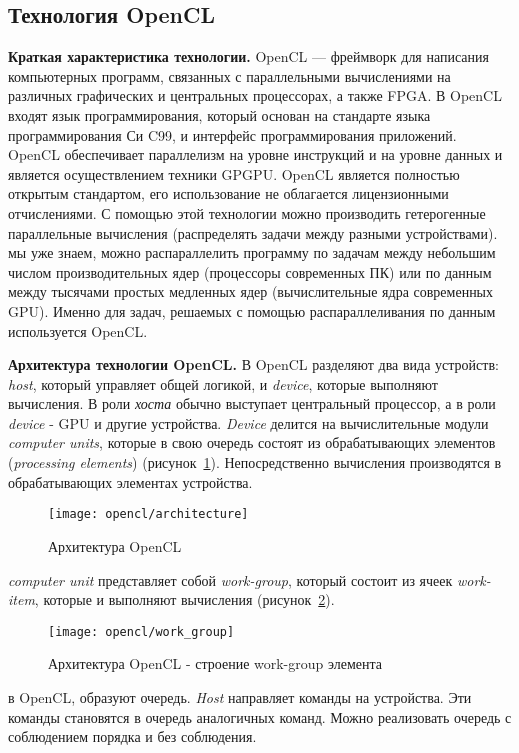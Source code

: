 { %
	\subsection{Технология OpenCL}
	\label{OpenCL:section}
	\par\textbf{Краткая характеристика технологии.} OpenCL — фреймворк для написания компьютерных программ, связанных с параллельными вычислениями на различных графических и центральных процессорах, а также FPGA. В OpenCL входят язык программирования, который основан на стандарте языка программирования Си C99, и интерфейс программирования приложений. OpenCL обеспечивает параллелизм на уровне инструкций и на уровне данных и является осуществлением техники GPGPU. OpenCL является полностью открытым стандартом, его использование не облагается лицензионными отчислениями. С помощью этой технологии можно производить гетерогенные параллельные вычисления (распределять задачи между разными устройствами).
	 мы уже знаем, можно распараллелить программу по задачам между небольшим числом производительных ядер (процессоры современных ПК) или по данным между тысячами простых медленных ядер (вычислительные ядра современных GPU). Именно для задач, решаемых с помощью распараллеливания по данным используется OpenCL.
	\par\textbf{Архитектура технологии OpenCL.} В OpenCL разделяют два вида устройств: \textit{host}, который управляет общей логикой, и \textit{device}, которые выполняют вычисления. В роли \textit{хоста} обычно выступает центральный процессор, а в роли \textit{device} - GPU и другие устройства. \textit{Device} делится на вычислительные модули \textit{computer units}, которые в свою очередь состоят из обрабатывающих элементов (\textit{processing elements}) (рисунок~\ref{OpenCLArchitecture:image}). Непосредственно вычисления производятся в обрабатывающих элементах устройства.
	\begin{figure}[H]
		\texttt{[image: opencl/architecture]}
		\caption{Архитектура OpenCL}
		\label{OpenCLArchitecture:image}
	\end{figure}
	 \textit{computer unit} представляет собой \textit{work-group}, который состоит из ячеек \textit{work-item}, которые и выполняют вычисления (рисунок~\ref{OpenCLWorkGroup:image}).
	\begin{figure}[H]
		\texttt{[image: opencl/work\_group]}
		\caption{Архитектура OpenCL - строение work-group элемента}
		\label{OpenCLWorkGroup:image}
	\end{figure}
	 в OpenCL, образуют очередь. \textit{Host} направляет команды на устройства. Эти команды становятся в очередь аналогичных команд. Можно реализовать очередь с соблюдением порядка и без соблюдения.
}
